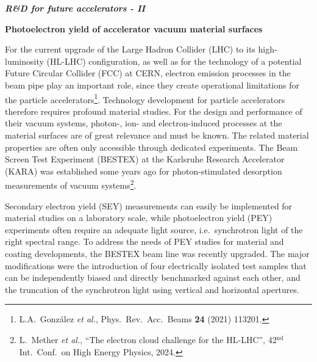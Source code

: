 \textbf{\textit{R\&D for future accelerators - II}} \mbox{}

\textbf{Photoelectron yield of accelerator vacuum material surfaces}\mbox{} 

For the current upgrade of the Large Hadron Collider (LHC) to its high-luminosity (HL-LHC) configuration, as well as for the technology of a potential Future Circular Collider (FCC) at CERN, electron emission processes in the beam pipe play an important role, since they create operational limitations for the particle accelerators\footnote{L.A.~Gonz\'alez \textit{et al.}, Phys.\ Rev.\ Acc.\ Beams \textbf{24} (2021) 113201.}. Technology development for particle accelerators therefore requires profound material studies. For the design and performance of their vacuum systems, photon-, ion- and electron-induced processes at the material surfaces are of great relevance and must be known. The related material properties are often only accessible through dedicated experiments. The Beam Screen Test Experiment (BESTEX) at the Karlsruhe Research Accelerator (KARA) was established some years ago for photon-stimulated desorption measurements of vacuum systems\footnote{L.~Mether \textit{et al.}, ``The electron cloud challenge for the HL-LHC'', 42$^{\mathrm{nd}}$ Int.\ Conf.\ on High Energy Physics, 2024.}.

Secondary electron yield (SEY) measurements can easily be implemented for material studies on a laboratory scale, while photoelectron yield (PEY) experiments often require an adequate light source, i.e.\ synchrotron light of the right spectral range. To address the needs of PEY studies for material and coating developments, the BESTEX beam line was recently upgraded. The major modifications were the introduction of four electrically isolated test samples that can be independently biased and directly benchmarked against each other, and the truncation of the synchrotron light using vertical and horizontal apertures.

